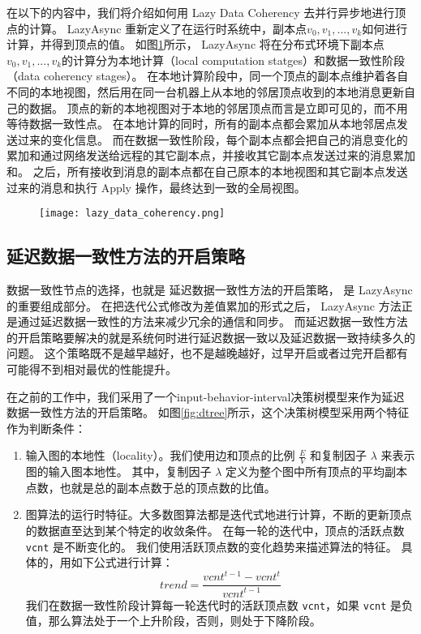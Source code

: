 在以下的内容中，我们将介绍如何用 Lazy Data Coherency 去并行异步地进行顶点的计算。
LazyAsync 重新定义了在运行时系统中，副本点$v_0, v_1, ..., v_k$如何进行计算，并得到顶点的值。
如图\ref{fig:lazy_data_coherency}所示，
LazyAsync 将在分布式环境下副本点$v_0, v_1, ..., v_k$的计算分为本地计算（local computation statges）和数据一致性阶段（data coherency stages）。
在本地计算阶段中，同一个顶点的副本点维护着各自不同的本地视图，然后用在同一台机器上从本地的邻居顶点收到的本地消息更新自己的数据。
顶点的新的本地视图对于本地的邻居顶点而言是立即可见的，而不用等待数据一致性点。
在本地计算的同时，所有的副本点都会累加从本地邻居点发送过来的变化信息。
而在数据一致性阶段，每个副本点都会把自己的消息变化的累加和通过网络发送给远程的其它副本点，并接收其它副本点发送过来的消息累加和。
之后，所有接收到消息的副本点都在自己原本的本地视图和其它副本点发送过来的消息和执行 Apply 操作，最终达到一致的全局视图。
\begin{figure}[!htbp]
\centering
\texttt{[image: lazy\_data\_coherency.png]}
\label{fig:lazy_data_coherency}
\end{figure}

\subsection{延迟数据一致性方法的开启策略}

数据一致性节点的选择，也就是 延迟数据一致性方法的开启策略， 是 LazyAsync 的重要组成部分。
在把迭代公式修改为差值累加的形式之后， LazyAsync 方法正是通过延迟数据一致性的方法来减少冗余的通信和同步。
而延迟数据一致性方法的开启策略要解决的就是系统何时进行延迟数据一致以及延迟数据一致持续多久的问题。
这个策略既不是越早越好，也不是越晚越好，过早开启或者过完开启都有可能得不到相对最优的性能提升。


在之前的工作中，我们采用了一个input-behavior-interval决策树模型来作为延迟数据一致性方法的开启策略。
如图\ref{fig:dtree}所示，这个决策树模型采用两个特征作为判断条件：

\begin{enumerate}
  \item 输入图的本地性（locality）。我们使用边和顶点的比例 $\frac{E}{V}$ 和复制因子 $\lambda$ 来表示图的输入图本地性。
  其中，复制因子 $\lambda$ 定义为整个图中所有顶点的平均副本点数，也就是总的副本点数于总的顶点数的比值。
  \item 图算法的运行时特征。大多数图算法都是迭代式地进行计算，不断的更新顶点的数据直至达到某个特定的收敛条件。
  在每一轮的迭代中，顶点的活跃点数\verb|vcnt| 是不断变化的。
  我们使用活跃顶点数的变化趋势来描述算法的特征。
  具体的，用如下公式进行计算：
  \begin{equation}
  \label{equ:chap04:trend}
  trend = \frac{vcnt^{t-1}-vcnt^t}{vcnt^{t-1}}
  \end{equation}
  我们在数据一致性阶段计算每一轮迭代时的活跃顶点数 \verb|vcnt|，如果 \verb|vcnt| 是负值，那么算法处于一个上升阶段，否则，则处于下降阶段。
\end{enumerate}

